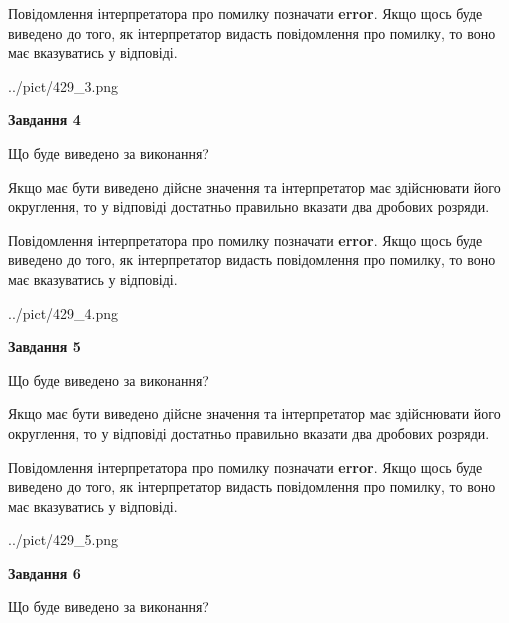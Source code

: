 \documentclass[12pt, ukrainian]{article}
\begin{document}
{\begin {Large}
Повідомлення інтерпретатора про помилку позначати \textbf{error}.
Якщо щось буде виведено до того, як інтерпретатор видасть повідомлення про помилку, 
то воно має вказуватись у відповіді. \par

\begin{center}
	{../pict/429_3.png}
\end{center}
\newpage

{\begin {center}\textbf{Завдання 4}\end {center}}\par
Що буде виведено за виконання? \par

Якщо має бути виведено дійсне значення та інтерпретатор має здійснювати його округлення, 
то у відповіді достатньо правильно вказати два дробових розряди.

Повідомлення інтерпретатора про помилку позначати \textbf{error}.
Якщо щось буде виведено до того, як інтерпретатор видасть повідомлення про помилку, 
то воно має вказуватись у відповіді. \par

\begin{center}
	{../pict/429_4.png}
\end{center}
\newpage

{\begin {center}\textbf{Завдання 5}\end {center}}\par
Що буде виведено за виконання? \par

Якщо має бути виведено дійсне значення та інтерпретатор має здійснювати його округлення, 
то у відповіді достатньо правильно вказати два дробових розряди.

Повідомлення інтерпретатора про помилку позначати \textbf{error}.
Якщо щось буде виведено до того, як інтерпретатор видасть повідомлення про помилку, 
то воно має вказуватись у відповіді. \par

\begin{center}
	{../pict/429_5.png}
\end{center}
\newpage

{\begin {center}\textbf{Завдання 6}\end {center}}\par
Що буде виведено за виконання? \par


\end{Large}}
\end{document}
